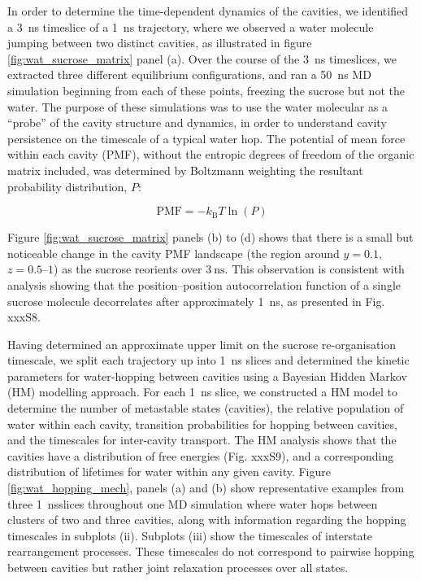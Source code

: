 In order to determine the time-dependent dynamics of the cavities, we identified a \SI{3}{\nano\second} timeslice of a \SI{1}{\nano\second} trajectory, where we observed a water molecule jumping between two distinct cavities, as illustrated in figure \ref{fig:wat_sucrose_matrix} panel (a). Over the course of the \SI{3}{\nano\second} timeslices, we extracted three different equilibrium configurations, and ran a \SI{50}{\nano\second} MD simulation beginning from each of these points, freezing the sucrose but not the water. The purpose of these simulations was to use the water molecular as a ``probe” of the cavity structure and dynamics, in order to understand cavity persistence on the timescale of a typical water hop. The potential of mean force within each cavity (PMF), without the entropic degrees of freedom of the organic matrix included, was determined by Boltzmann weighting the resultant probability distribution, $P$: 

\begin{equation}\label{eqn:pmf}
\mathrm{PMF}=-k_{\mathrm{B}} T \ln (P)
\end{equation}

Figure \ref{fig:wat_sucrose_matrix} panels (b) to (d) shows that there is a small but noticeable change in the cavity PMF landscape (the region around $y = 0.1$, $z = \numrange[range-phrase=-]{0.5}{1}$) as the sucrose reorients over $\SI{3}{\nano\second}$. This observation is consistent with analysis showing that the position–position autocorrelation function of a single sucrose molecule decorrelates after approximately \SI{1}{\nano\second}, as presented in Fig. xxxS8. 

Having determined an approximate upper limit on the sucrose re-organisation timescale, we split each trajectory up into \SI{1}{\nano\second} slices and determined the kinetic parameters for water-hopping between cavities using a Bayesian Hidden Markov (HM) modelling approach. For each \SI{1}{\nano\second} slice, we constructed a HM model to determine the number of metastable states (cavities), the relative population of water within each cavity, transition probabilities for hopping between cavities, and the timescales for inter-cavity transport. The HM analysis shows that the cavities have a distribution of free energies (Fig. xxxS9), and a corresponding distribution of lifetimes for water within any given cavity. Figure \ref{fig:wat_hopping_mech}, panels (a) and (b) show representative examples from three \SI{1}{\nano\second}slices throughout one MD simulation where water hops between clusters of two and three cavities, along with information regarding the hopping timescales in subplots (ii). Subplots (iii) show the timescales of interstate rearrangement processes. These timescales do not correspond to pairwise hopping between cavities but rather joint relaxation processes over all states.

